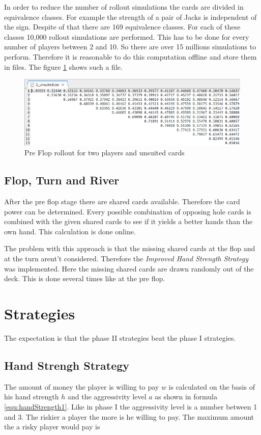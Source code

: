 In order to reduce the number of rollout simulations the cards are divided in equivalence classes. For example the strength of a pair of Jacks is independent of the sign. Despite of that there are 169 equivalence classes. For each of these classes 10,000 rollout simulations are performed. This has to be done for every number of players between 2 and 10. So there are over 15 millions simulations to perform. Therefore it is reasonable to do this computation offline and store them in files. The figure \ref{fig:preflop} shows such a file.

\begin{figure}[h]
  \centering
  \includegraphics[width=1.0\textwidth]{images/preflop}
  \caption{Pre Flop rollout for two players and unsuited cards}
  \label{fig:preflop}
\end{figure}

\subsection{Flop, Turn and River}
After the pre flop stage there are shared cards available. Therefore the card power can be determined. Every possible combination of opposing hole cards is combined with the given shared cards to see if it yields a better hands than the own hand. This calculation is done online.

The problem with this approach is that the missing shared cards at the flop and at the turn arent't considered. Therefore the \emph{Improved Hand Strength Strategy} was implemented. Here the missing shared cards are drawn randomly out of the deck. This is done several times like at the pre flop.

\section{Strategies}
The expectation is that the phase II strategies beat the phase I strategies.

\subsection{Hand Strengh Strategy}
The amount of money the player is willing to pay $w$ is calculated on the basis of his hand strength $h$ and the aggressivity level $a$ as shown in formula \ref{equ:handStrength1}. Like in phase I the aggressivity level is a number between 1 and 3. The riskier a player the more is he willing to pay. The maximum amount the a risky player would pay is 

